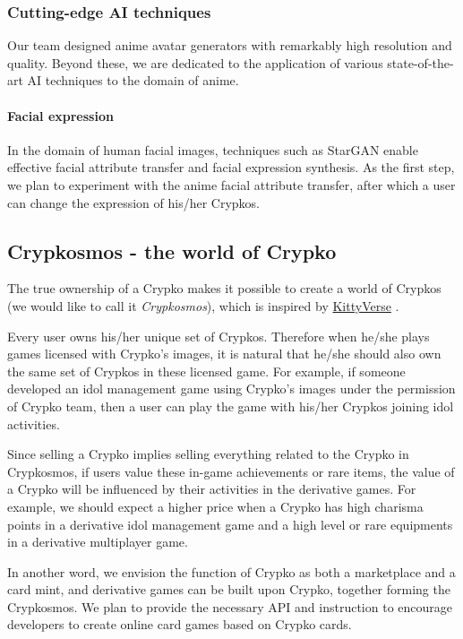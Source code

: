 \documentclass[a4paper]{article}
\begin{document}
\subsubsection{Cutting-edge AI techniques}

Our team designed anime avatar generators with remarkably high resolution and quality. Beyond these, we are dedicated to the application of various state-of-the-art AI techniques to the domain of anime.

\paragraph{Facial expression}

In the domain of human facial images, techniques such as StarGAN \cite{choi2017stargan} enable effective facial attribute transfer and facial expression synthesis. 
As the first step, we plan to experiment with the anime facial attribute transfer, after which a user can change the expression of his/her Crypkos.



\subsection{Crypkosmos - the world of Crypko}

The true ownership of a Crypko makes it possible to create a world of Crypkos (we would like to call it \emph{Crypkosmos}), which is inspired by \href{https://www.cryptokitties.co/kittyverse}{KittyVerse} \cite{cryptokitties}. 

Every user owns his/her unique set of Crypkos. 
Therefore when he/she plays games licensed with Crypko's images, it is natural that he/she should also own the same set of Crypkos in these licensed game. 
For example, if someone developed an idol management game using Crypko's images under the permission of Crypko team, then a user can play the game with his/her Crypkos joining idol activities.

Since selling a Crypko implies selling everything related to the Crypko in Crypkosmos, 
if users value these in-game achievements or rare items, 
the value of a Crypko will be influenced by their activities in the derivative games. 
For example, we should expect a higher price when a Crypko has high charisma points in a derivative idol management game and a high level or rare equipments in a derivative multiplayer game.

In another word, we envision the function of Crypko as both a marketplace and a card mint, 
and derivative games can be built upon Crypko, together forming the Crypkosmos. 
We plan to provide the necessary API and instruction to encourage developers to create online card games based on Crypko cards.
\end{document}

